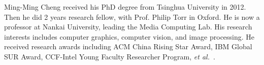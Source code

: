 \documentclass[10pt,journal,cspaper,compsoc]{IEEEtran}
\def\etal{\emph{et al.~}}
\begin{document}
{\begin{IEEEbiography}{Ming-Ming Cheng}
received his PhD degree
from Tsinghua University in 2012. Then he did
2 years research fellow, with Prof. Philip Torr in
Oxford. He is now a professor at Nankai University, leading the Media Computing Lab. His
research interests includes computer graphics,
computer vision, and image processing. He received research awards including ACM China
Rising Star Award, IBM Global SUR Award,
CCF-Intel Young Faculty Researcher Program,
\etal .
\end{IEEEbiography}
}
\end{document}
